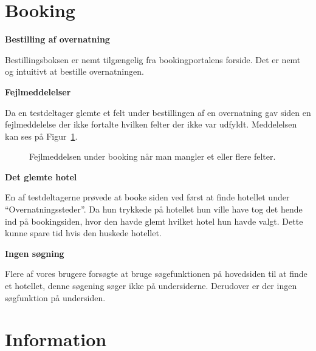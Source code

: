 \documentclass[10pt,a4paper]{article}      %
\newcommand\pic[1]{\texttt{[image: Pics/\#1]}}
\renewcommand\good{\pic{good}}
\renewcommand\goodidea{\pic{goodidea}}
\renewcommand\smallproblem{\pic{smallproblem}}
\renewcommand\seriousproblem{\pic{seriousproblem}}
\begin{document}
\section{Booking}
\begin{kommentarer}
\item[\good] \textbf{Bestilling af overnatning}

Bestillingsboksen er nemt tilgængelig fra bookingportalens forside. Det er nemt og intuitivt
at bestille overnatningen.

\item[\smallproblem] \textbf{Fejlmeddelelser}

Da en testdeltager glemte et felt under bestillingen af en overnatning gav siden en
fejlmeddelelse der ikke fortalte hvilken felter der ikke var udfyldt. Meddelelsen kan ses på
Figur~\ref{fig:fejlmeddelelsebooking}.

\begin{figure}[htbp]
    \centering
    \caption{Fejlmeddelsen under booking når man mangler et eller flere felter.}
    \label{fig:fejlmeddelelsebooking}
\end{figure}

\item[\goodidea] \textbf{Det glemte hotel}

En af testdeltagerne prøvede at booke siden ved først at finde hotellet under
``Overnatningssteder''. Da hun trykkede på hotellet hun ville have tog det hende ind på
bookingsiden, hvor den havde glemt hvilket hotel hun havde valgt. Dette kunne spare tid hvis
den huskede hotellet.

\item[\seriousproblem] \textbf{Ingen søgning}

Flere af vores brugere forsøgte at bruge søgefunktionen på hovedsiden til at finde et
hotellet, denne søgening søger ikke på undersiderne. Derudover er der ingen søgfunktion på
undersiden.

\end{kommentarer}


\section{Information}
\end{document}
